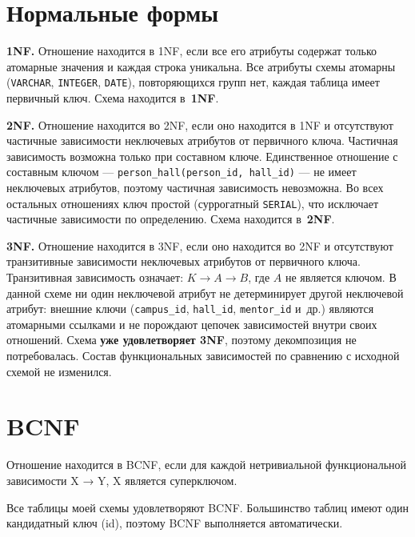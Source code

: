 \documentclass[12pt,a4paper]{article}
\begin{document}
\newpage
\section{Нормальные формы}


\textbf{1NF.} Отношение находится в 1NF, если все его атрибуты содержат только
атомарные значения и каждая строка уникальна. Все атрибуты схемы атомарны
(\texttt{VARCHAR}, \texttt{INTEGER}, \texttt{DATE}), повторяющихся групп нет,
каждая таблица имеет первичный ключ. Схема находится в~\textbf{1NF}.


\vspace{5pt}
\textbf{2NF.} Отношение находится во 2NF, если оно находится в 1NF и
отсутствуют частичные зависимости неключевых атрибутов от первичного ключа.
Частичная зависимость возможна только при составном ключе. Единственное
отношение с составным ключом ---
\texttt{person\_hall(person\_id,\,hall\_id)} ---
не имеет неключевых атрибутов, поэтому частичная зависимость невозможна.
Во всех остальных отношениях ключ простой (суррогатный \texttt{SERIAL}),
что исключает частичные зависимости по определению.
Схема находится в~\textbf{2NF}.

\vspace{5pt}
\textbf{3NF.} Отношение находится в 3NF, если оно находится во 2NF и
отсутствуют транзитивные зависимости неключевых атрибутов от первичного
ключа. Транзитивная зависимость означает: $K \to A \to B$, где $A$ не
является ключом. В данной схеме ни один неключевой атрибут не детерминирует
другой неключевой атрибут: внешние ключи (\texttt{campus\_id},
\texttt{hall\_id}, \texttt{mentor\_id} и~др.) являются атомарными ссылками
и не порождают цепочек зависимостей внутри своих отношений.
Схема \textbf{уже удовлетворяет 3NF}, поэтому декомпозиция не потребовалась.
Состав функциональных зависимостей по сравнению с исходной схемой
не изменился.

\section{BCNF}

Отношение находится в BCNF, если для каждой нетривиальной функциональной зависимости X → Y, X является суперключом.

Все таблицы моей схемы удовлетворяют BCNF. Большинство таблиц имеют один кандидатный ключ (id), поэтому BCNF выполняется автоматически.
\end{document}
